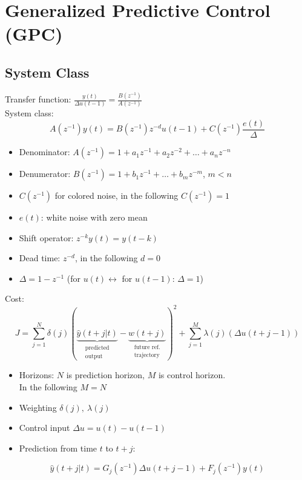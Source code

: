 \documentclass[english]{latex4ei/latex4ei_sheet}
\begin{document}
\section{Generalized Predictive Control (GPC)}
\begin{sectionbox}

\subsection{System Class}
Transfer function: $\frac{y(t)}{\Delta u(t-1)}=\frac{B(z^{-1})}{A(z^{-1})}$\\
System class:
$$A\left(z^{-1}\right) y(t)=B\left(z^{-1}\right) z^{-d} u(t-1)+C\left(z^{-1}\right) \frac{e(t)}{\Delta}$$
\begin{itemize}
    \item Denominator: $A\left(z^{-1}\right)=1+a_{1} z^{-1}+a_{2} z^{-2}+\ldots+a_{n} z^{-n}$
    \item Denumerator: $B\left(z^{-1}\right)=1+b_{1} z^{-1}+\ldots+b_{m} z^{-m}$, $m<n$
    \item $C\left(z^{-1}\right)$ for colored noise, in the following $C\left(z^{-1}\right)=1$
    \item $e(t)$: white noise with zero mean
    \\
    \item Shift operator: $z^{-k} y(t)=y(t-k)$
    \item Dead time: $z^{-d}$, in the following $d=0$
    \item $\Delta=1-z^{-1}$ (for $u(t) \leftrightarrow$ for $u(t-1)$: $\Delta=1$)
\end{itemize} \vspace{0.1cm}
Cost: 
$$J=\sum_{j=1}^{N} \delta(j)(\underbrace{\hat{y}(t+j | t)}_{\substack{\text{predicted} \\ \text{output}}}-\underbrace{w(t+j)}_{\substack{\text{future ref.} \\ \text{trajectory}}})^{2}+\sum_{j=1}^{M} \lambda(j)(\Delta u(t+j-1))
$$
\begin{itemize}
    \item Horizons: $N$ is prediction horizon, $M$ is control horizon.\\
    In the following $M=N$
    \item Weighting $\delta(j),\ \lambda(j)$
    \item Control input $\Delta u = u(t)-u(t-1)$
    \item Prediction from time $t$ to $t+j$:
\end{itemize}
$$\hat{y}(t+j | t)=G_{j}(z^{-1})\Delta u(t+j-1)+F_{j}(z^{-1})y(t)
$$


\end{sectionbox}
\end{document}
